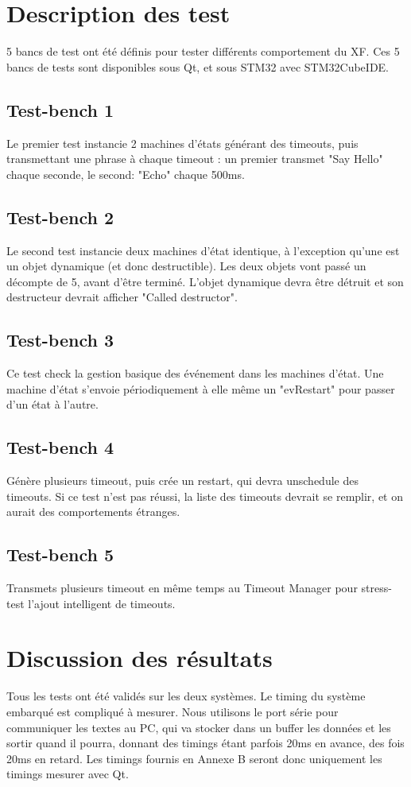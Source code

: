 \section{Description des test}
5 bancs de test ont été définis pour tester différents comportement du XF.
Ces 5 bancs de tests sont disponibles sous Qt, et sous STM32 avec STM32CubeIDE.
\subsection{Test-bench 1}
Le premier test instancie 2 machines d'états générant des timeouts, puis
transmettant une phrase à chaque timeout : un premier transmet "Say Hello" chaque
seconde, le second: "Echo" chaque 500ms.

\subsection{Test-bench 2}
Le second test instancie deux machines d'état identique, à l'exception qu'une
est un objet dynamique (et donc destructible).
Les deux objets vont passé un décompte de 5, avant d'être terminé. L'objet dynamique
devra être détruit et son destructeur devrait afficher "Called destructor".

\subsection{Test-bench 3}
Ce test check la gestion basique des événement dans les machines d'état.
Une machine d'état s'envoie périodiquement à elle même un "evRestart" pour
passer d'un état à l'autre.

\subsection{Test-bench 4}
Génère plusieurs timeout, puis crée un restart, qui devra unschedule des timeouts.
Si ce test n'est pas réussi, la liste des timeouts devrait se remplir, et on
aurait des comportements étranges.

\subsection{Test-bench 5}
Transmets plusieurs timeout en même temps au Timeout Manager pour stress-test l'ajout
intelligent de timeouts.

\section{Discussion des résultats}
Tous les tests ont été validés sur les deux systèmes. Le timing du système embarqué
est compliqué à mesurer. Nous utilisons le port série pour communiquer les
textes au PC, qui va stocker dans un buffer les données et les sortir quand il
pourra, donnant des timings étant parfois 20ms en avance, des fois 20ms en retard.
Les timings fournis en Annexe B seront donc uniquement les timings mesurer avec Qt.